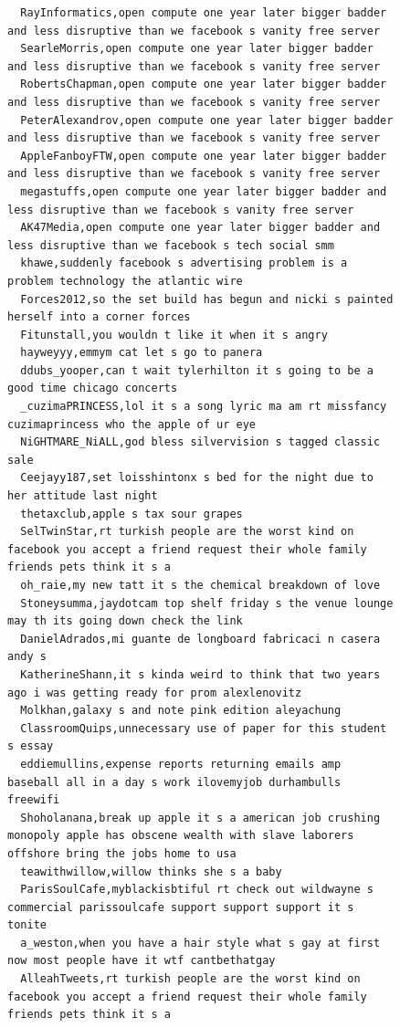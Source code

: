 \begin{figure}[htpb]
\begin{verbatim}
  RayInformatics,open compute one year later bigger badder and less disruptive than we facebook s vanity free server
  SearleMorris,open compute one year later bigger badder and less disruptive than we facebook s vanity free server
  RobertsChapman,open compute one year later bigger badder and less disruptive than we facebook s vanity free server
  PeterAlexandrov,open compute one year later bigger badder and less disruptive than we facebook s vanity free server
  AppleFanboyFTW,open compute one year later bigger badder and less disruptive than we facebook s vanity free server
  megastuffs,open compute one year later bigger badder and less disruptive than we facebook s vanity free server
  AK47Media,open compute one year later bigger badder and less disruptive than we facebook s tech social smm
  khawe,suddenly facebook s advertising problem is a problem technology the atlantic wire
  Forces2012,so the set build has begun and nicki s painted herself into a corner forces
  Fitunstall,you wouldn t like it when it s angry
  hayweyyy,emmym cat let s go to panera
  ddubs_yooper,can t wait tylerhilton it s going to be a good time chicago concerts
  _cuzimaPRINCESS,lol it s a song lyric ma am rt missfancy cuzimaprincess who the apple of ur eye
  NiGHTMARE_NiALL,god bless silvervision s tagged classic sale
  Ceejayy187,set loisshintonx s bed for the night due to her attitude last night
  thetaxclub,apple s tax sour grapes
  SelTwinStar,rt turkish people are the worst kind on facebook you accept a friend request their whole family friends pets think it s a
  oh_raie,my new tatt it s the chemical breakdown of love
  Stoneysumma,jaydotcam top shelf friday s the venue lounge may th its going down check the link
  DanielAdrados,mi guante de longboard fabricaci n casera andy s
  KatherineShann,it s kinda weird to think that two years ago i was getting ready for prom alexlenovitz
  Molkhan,galaxy s and note pink edition aleyachung
  ClassroomQuips,unnecessary use of paper for this student s essay
  eddiemullins,expense reports returning emails amp baseball all in a day s work ilovemyjob durhambulls freewifi
  Shoholanana,break up apple it s a american job crushing monopoly apple has obscene wealth with slave laborers offshore bring the jobs home to usa
  teawithwillow,willow thinks she s a baby
  ParisSoulCafe,myblackisbtiful rt check out wildwayne s commercial parissoulcafe support support support it s tonite
  a_weston,when you have a hair style what s gay at first now most people have it wtf cantbethatgay
  AlleahTweets,rt turkish people are the worst kind on facebook you accept a friend request their whole family friends pets think it s a

\end{verbatim}
\end{figure}

